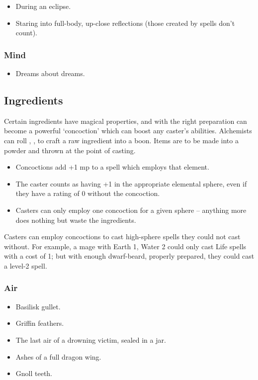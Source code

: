 \begin{multicols}{2}
\begin{itemize}
  \item
  During an eclipse.
  \item
  Staring into full-body, up-close reflections (those created by spells don't count).
\end{itemize}

\subsubsection{Mind}

\begin{itemize}
  \item
  Dreams about dreams.
\end{itemize}

\subsection{Ingredients}
\label{magicIngredients}

Certain ingredients have magical properties, and with the right preparation can become a powerful `concoction' which can boost any caster's abilities.
Alchemists can roll , \tn[12], to craft a raw ingredient into a boon.
Items are to be made into a powder and thrown at the point of casting.

\begin{itemize}
  \item
  Concoctions add +1 \gls{mp} to a spell which employs that element.
  \item
  The caster counts as having +1 in the appropriate elemental sphere, even if they have a rating of 0 without the concoction.
  \item
  Casters can only employ one concoction for a given sphere -- anything more does nothing but waste the ingredients.
\end{itemize}

Casters can employ concoctions to cast high-sphere spells they could not cast without.
For example, a mage with Earth 1, Water 2 could only cast Life spells with a cost of 1; but with enough dwarf-beard, properly prepared, they could cast a level-2 spell.

\subsubsection{Air}

\begin{itemize}
  \item
  Basilisk gullet.
  \item
  Griffin feathers.
  \item
  The last air of a drowning victim, sealed in a jar.
  \item
  Ashes of a full dragon wing.
  \item
  Gnoll teeth.
\end{itemize}


\end{multicols}
